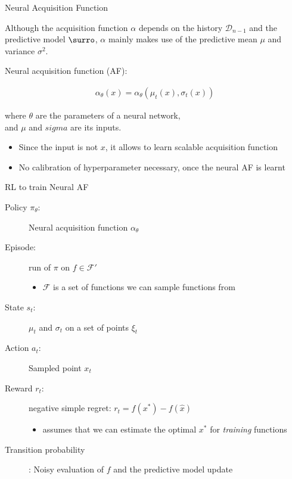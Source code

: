 \begin{frame}[c]{Neural Acquisition Function }

Although the acquisition function $\alpha$ depends on the history $\mathcal{D}_{n-1}$ and the predictive model $\surro$, $\alpha$ mainly makes use of the predictive mean $\mu$ and variance $\sigma^2$.

\pause
\bigskip

Neural acquisition function (AF):

\begin{eqnarray}
\alpha_\theta(x) = \alpha_\theta(\mu_t(x), \sigma_t(x)) \nonumber
\end{eqnarray}

where $\theta$ are the parameters of a neural network,\\ and $\mu$ and $sigma$ are its inputs.

\begin{itemize}
	\item Since the input is not $x$, it allows to learn scalable acquisition function
	\item No calibration of hyperparameter necessary, once the neural AF is learnt
\end{itemize}

\end{frame}
\begin{frame}[c]{RL to train Neural AF }

\begin{description}
	\item[Policy $\pi_\theta$:] Neural acquisition function $\alpha_\theta$
	\pause
	\item[Episode:] run of $\pi$ on $f\in \mathcal{F}'$
	\begin{itemize}
		\item $\mathcal{F}$ is a set of functions we can sample functions from
	\end{itemize}
	\pause
	\item[State $s_t$:] $\mu_t$ and $\sigma_t$ on a set of points $\xi_t$
	\pause
	\item[Action $a_t$:] Sampled point $x_t$
	\pause
	\item[Reward $r_t$:] negative simple regret: $r_t = f(x^*) - f(\hat{x})$
	\begin{itemize}
		\item assumes that we can estimate the optimal $x^*$ for \emph{training} functions
	\end{itemize}
	\pause
	\item[Transition probability]: Noisy evaluation of $f$ and the predictive model update
\end{description}

\end{frame}
